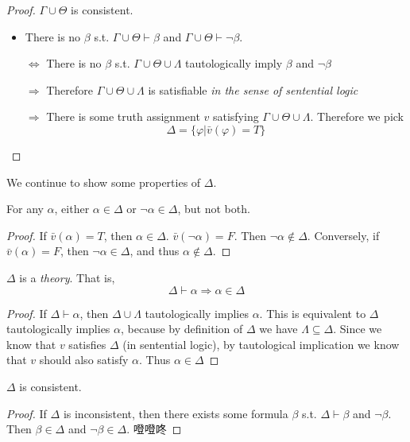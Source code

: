\begin{proof}
    $\Gamma\cup\Theta$ is consistent.
    \begin{itemize}
        \item There is no $\beta$ s.t. $\Gamma\cup\Theta\vdash\beta$ and $\Gamma\cup\Theta\vdash\neg\beta$.
        \item[$\Leftrightarrow$] There is no $\beta$ s.t. $\Gamma\cup\Theta\cup\Lambda$ tautologically imply $\beta$ and $\neg\beta$
        \item[$\Rightarrow$] Therefore $\Gamma\cup\Theta\cup\Lambda$ is satisfiable \emph{in the sense of sentential logic}
        \item[$\Rightarrow$] There is some truth assignment $v$ satisfying $\Gamma\cup\Theta\cup\Lambda$. Therefore we pick
        \[ \Delta = \{ \varphi | \bar{v}(\varphi) = T \} \]
    \end{itemize}
\end{proof}

We continue to show some properties of $\Delta$.

\begin{proposition}
    For any $\alpha$, either $\alpha\in\Delta$ or $\neg\alpha\in\Delta$, but not both.
\end{proposition}
\begin{proof}
    If $\bar{v}(\alpha) = T$, then $\alpha\in\Delta$. $\bar{v}(\neg\alpha)=F$. Then $\neg\alpha\notin\Delta$. Conversely, if $\bar{v}(\alpha)=F$, then $\neg\alpha\in\Delta$, and thus $\alpha\notin\Delta$.
\end{proof}

\begin{proposition}
    $\Delta$ is a \emph{theory}. That is,
    \[ \Delta\vdash\alpha \Longrightarrow \alpha\in\Delta \]
\end{proposition}
\begin{proof}
    If $\Delta\vdash\alpha$, then $\Delta\cup\Lambda$ tautologically implies $\alpha$. This is equivalent to $\Delta$ tautologically implies $\alpha$, because by definition of $\Delta$ we have $\Lambda\subseteq\Delta$. Since we know that $v$ satisfies $\Delta$ (in sentential logic), by tautological implication we know that $v$ should also satisfy $\alpha$. Thus $\alpha\in\Delta$
\end{proof}

\begin{proposition}
    $\Delta$ is consistent.
\end{proposition}
\begin{proof}
    If $\Delta$ is inconsistent, then there exists some formula $\beta$ s.t. $\Delta\vdash\beta$ and $\neg\beta$. Then $\beta\in\Delta$ and $\neg\beta\in\Delta$. 噔噔咚
\end{proof}

